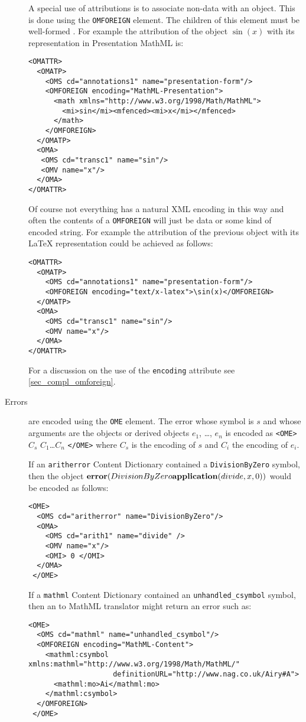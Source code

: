 \begin{description}
A special use of attributions is to associate non-\OM data with an \OM object.  This is
done using the \lstinline|OMFOREIGN| element.  The children of this element must be
well-formed \XML.  For example the attribution of the \OM object $\sin(x)$ with its
representation in Presentation MathML is:
\begin{lstlisting}
<OMATTR>
  <OMATP>
    <OMS cd="annotations1" name="presentation-form"/>  
    <OMFOREIGN encoding="MathML-Presentation">
      <math xmlns="http://www.w3.org/1998/Math/MathML">
        <mi>sin</mi><mfenced><mi>x</mi></mfenced>
      </math>
    </OMFOREIGN>  
  </OMATP>
  <OMA>
   <OMS cd="transc1" name="sin"/> 
   <OMV name="x"/>  
  </OMA>
</OMATTR>
\end{lstlisting}
Of course not everything has a natural XML encoding in this way and
often the contents of a \lstinline|OMFOREIGN| will just
be data or some kind of encoded string.  For example the attribution
of the previous object with its LaTeX representation could be achieved
as follows:
\begin{lstlisting}
<OMATTR>
  <OMATP>
    <OMS cd="annotations1" name="presentation-form"/>  
    <OMFOREIGN encoding="text/x-latex">\sin(x)</OMFOREIGN>  
  </OMATP>
  <OMA>
    <OMS cd="transc1" name="sin"/> 
    <OMV name="x"/>  
  </OMA>
</OMATTR>
\end{lstlisting}
For a discussion on the use of the \lstinline|encoding|
attribute see \ref{sec_compl_omforeign}.
\item[Errors] are encoded using the \lstinline|OME| element. The error whose symbol is $s$
  and whose arguments are the \OM objects or \OM derived objects $e_1$, \ldots, $e_n$ is
  encoded as \lstinline|<OME>| $C_s$ $C_1$\ldots $C_n$ \lstinline|</OME>| where $C_s$ is
  the encoding of $s$ and $C_i$ the encoding of $e_i$.

  If an \lstinline|aritherror| Content Dictionary contained a \lstinline|DivisionByZero|
  symbol, then the object
  $\mathbf{error}(DivisionByZero{\mathbf{application}(divide,x,0)})$ would be encoded as follows:

\begin{lstlisting}
<OME>
  <OMS cd="aritherror" name="DivisionByZero"/>  
  <OMA>
    <OMS cd="arith1" name="divide" />
    <OMV name="x"/>  
    <OMI> 0 </OMI>
  </OMA> 
 </OME>
\end{lstlisting}

  If a \lstinline|mathml| Content Dictionary contained an \lstinline|unhandled_csymbol|
  symbol, then an \OM to MathML translator might return an error such as:
\begin{lstlisting}
<OME>
  <OMS cd="mathml" name="unhandled_csymbol"/>  
  <OMFOREIGN encoding="MathML-Content">
    <mathml:csymbol xmlns:mathml="http://www.w3.org/1998/Math/MathML/"
                    definitionURL="http://www.nag.co.uk/Airy#A">
      <mathml:mo>Ai</mathml:mo>
    </mathml:csymbol>
  </OMFOREIGN> 
 </OME>
\end{lstlisting}


\end{description}
